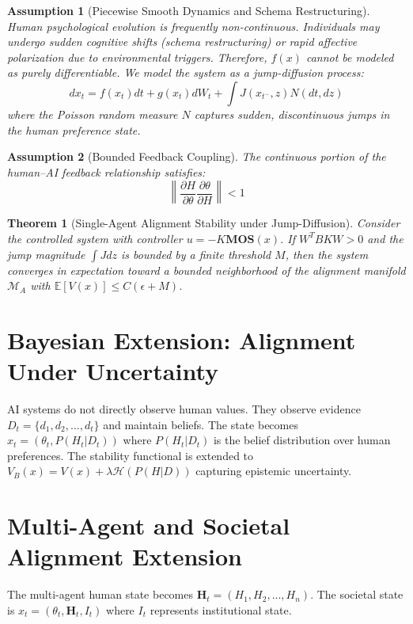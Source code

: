 \documentclass[11pt]{article}
\newtheorem{theorem}{Theorem}
\newtheorem{assumption}{Assumption}
\begin{document}
\begin{assumption}[Piecewise Smooth Dynamics and Schema Restructuring]
Human psychological evolution is frequently non-continuous. Individuals may undergo sudden cognitive shifts (schema restructuring) or rapid affective polarization due to environmental triggers. Therefore, $f(x)$ cannot be modeled as purely differentiable. We model the system as a jump-diffusion process:
\[
dx_t = f(x_t)dt + g(x_t)dW_t + \int J(x_{t^-}, z) N(dt, dz)
\]
where the Poisson random measure $N$ captures sudden, discontinuous jumps in the human preference state.
\end{assumption}

\begin{assumption}[Bounded Feedback Coupling]
The continuous portion of the human--AI feedback relationship satisfies:
\[
\left\| \frac{\partial H}{\partial\theta} \frac{\partial\theta}{\partial H} \right\| < 1
\]
\end{assumption}

\begin{theorem}[Single-Agent Alignment Stability under Jump-Diffusion]
Consider the controlled system with controller $u=-K\mathbf{MOS}(x)$. If $W^TBKW>0$ and the jump magnitude $\int J dz$ is bounded by a finite threshold $M$, then the system converges in expectation toward a bounded neighborhood of the alignment manifold $\mathcal{M}_A$ with $\mathbb{E}[V(x)] \leq C(\epsilon + M)$.
\end{theorem}

\section{Bayesian Extension: Alignment Under Uncertainty}
AI systems do not directly observe human values. They observe evidence $D_t = \{d_1,d_2,...,d_t\}$ and maintain beliefs. The state becomes $x_t = (\theta_t,P(H_t|D_t))$ where $P(H_t|D_t)$ is the belief distribution over human preferences. The stability functional is extended to $V_B(x) = V(x)+\lambda \mathcal{H}(P(H|D))$ capturing epistemic uncertainty.

\section{Multi-Agent and Societal Alignment Extension}
The multi-agent human state becomes $\mathbf H_t = (H_1,H_2,...,H_n)$. The societal state is $x_t = (\theta_t,\mathbf H_t,I_t)$ where $I_t$ represents institutional state.
\end{document}
